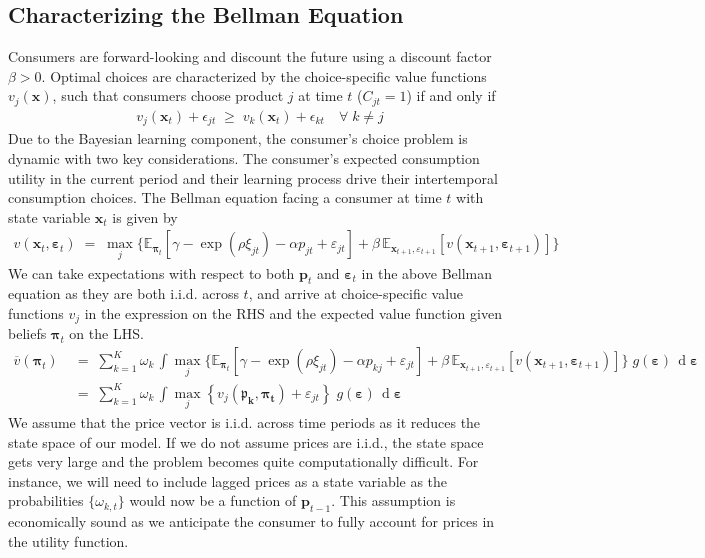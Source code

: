 \documentclass[11pt]{article}
\newcommand{\E}{\mathbb{E}}
\begin{document}
\subsection*{Characterizing the Bellman Equation}
Consumers are forward-looking and discount the future using a discount factor $\beta>0 .$ Optimal choices are characterized by the choice-specific value functions $v_{j}(\boldsymbol{x})$, such that consumers choose product $j$ at time $t$ ($C_{jt} = 1$) if and only if 
\begin{gather*}
    v_{j}\left(\boldsymbol{x}_{t}\right)+\epsilon_{jt} \; \geq \;  v_{k}\left(\boldsymbol{x}_{t}\right)+\epsilon_{k t} \quad \forall \; k \neq j
\end{gather*}
Due to the Bayesian learning component, the consumer's choice problem is dynamic with two key considerations. The consumer's expected consumption utility in the current period and their learning process drive their intertemporal consumption choices. The Bellman equation facing a consumer at time $t$ with state variable $\boldsymbol{x}_t$ is given by
\begin{gather*}
    v\left(\boldsymbol{x}_{t}, \boldsymbol{\varepsilon}_{t}\right) \; = \; \max _{j}  \Big\{ \E_{{\boldsymbol{\pi}_{t}}}\left[\gamma-\exp \left(\rho \xi_{j t}\right)-\alpha p_{j t}+\varepsilon_{j t} \right]+ \beta \, \E_{\boldsymbol{x}_{t+1}, \varepsilon_{t+1}} \left[ v \left(\boldsymbol{x}_{t+1}, \boldsymbol{\varepsilon}_{t+1}\right)  \right] \Big\}
\end{gather*}
We can take expectations with respect to both $\boldsymbol{p}_t$ and $\boldsymbol{\varepsilon}_t$ in the above Bellman equation as they are both i.i.d. across $t$, and arrive at choice-specific value functions $v_j$ in the expression on the RHS and the expected value function given beliefs $\boldsymbol{\pi}_t$ on the LHS.
\begin{align}
\overline{v}(\boldsymbol{\pi}_t) \; &= \; \sum_{k=1}^K \omega_k \, \int \max_j  \Big\{ \E_{{\boldsymbol{\pi}_{t}}}\left[\gamma-\exp \left(\rho \xi_{j t}\right)-\alpha p_{kj}+\varepsilon_{j t} \right]+ \beta \, \E_{\boldsymbol{x}_{t+1}, \varepsilon_{t+1}} \left[ v \left(\boldsymbol{x}_{t+1}, \boldsymbol{\varepsilon}_{t+1}\right)  \right] \Big\} \; g(\boldsymbol\varepsilon) \,\operatorname{d}\boldsymbol\varepsilon \\
& = \;  \sum_{k=1}^K \omega_k \, \int \max_j  \left\{ v_j(\mathbf{\boldsymbol{\mathfrak{p}}_k, \boldsymbol{\pi}_t}) +  \varepsilon_{j t} \right\} \; g(\boldsymbol\varepsilon) \,\operatorname{d} \label{eq:BE-1}\boldsymbol\varepsilon
\end{align}
We assume that the price vector is i.i.d. across time periods as it reduces the state space of our model. If we do not assume prices are i.i.d., the state space gets very large and the problem becomes quite computationally difficult. For instance, we will need to include lagged prices as a state variable as the probabilities $\{\omega_{k,t}\}$ would now be a function of $\boldsymbol{p}_{t-1}$. This assumption is economically sound as we anticipate the consumer to fully account for prices in the utility function.\\
\end{document}
